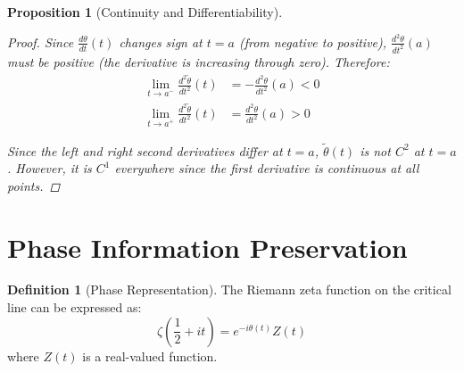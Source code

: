 \documentclass{article}
\newtheorem{proposition}[theorem]{Proposition}
\theoremstyle{definition}
\newtheorem{definition}[theorem]{Definition}
\begin{document}
\begin{proposition}[Continuity and Differentiability]
\begin{proof}
Since $\frac{d\theta}{dt}(t)$ changes sign at $t = a$ (from negative to positive), $\frac{d^2\theta}{dt^2}(a)$ must be positive (the derivative is increasing through zero). Therefore:
\begin{align}
\lim_{t \to a^-} \frac{d^2\tilde{\theta}}{dt^2}(t) &= -\frac{d^2\theta}{dt^2}(a) < 0 \\
\lim_{t \to a^+} \frac{d^2\tilde{\theta}}{dt^2}(t) &= \frac{d^2\theta}{dt^2}(a) > 0
\end{align}

Since the left and right second derivatives differ at $t = a$, $\tilde{\theta}(t)$ is not $C^2$ at $t = a$. However, it is $C^1$ everywhere since the first derivative is continuous at all points.
\end{proof}
\end{proposition}

\section{Phase Information Preservation}

\begin{definition}[Phase Representation]
The Riemann zeta function on the critical line can be expressed as:
\begin{equation}
\zeta\left(\frac{1}{2} + it\right) = e^{-i\theta(t)}Z(t)
\end{equation}
where $Z(t)$ is a real-valued function.
\end{definition}
\end{document}
